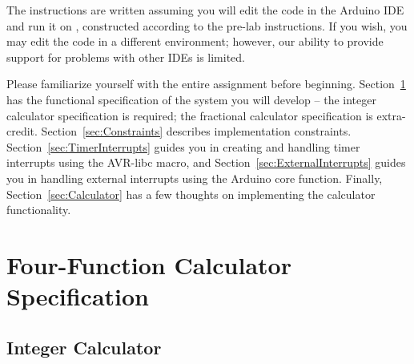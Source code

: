 The instructions are written assuming you will edit the code in the Arduino IDE
and run it on \runtimeenvironment, constructed according to the pre-lab
instructions. If you wish, you may edit the code in a different environment;
however, our ability to provide support for problems with other IDEs is limited.

Please familiarize yourself with the entire assignment before beginning.
Section~\ref{sec:FunctionalSpecification} has the functional specification of
the system you will develop -- the integer calculator specification is
required; the fractional calculator specification is extra-credit.
Section~\ref{sec:Constraints} describes implementation constraints.
Section~\ref{sec:TimerInterrupts} guides you in creating and handling timer
interrupts using the AVR-libc  macro, and
Section~\ref{sec:ExternalInterrupts} guides you in handling external interrupts
using the Arduino core  function. Finally,
Section~\ref{sec:Calculator} has a few thoughts on implementing the calculator
functionality.

\section{Four-Function Calculator Specification} \label{sec:FunctionalSpecification}

\subsection*{Integer Calculator}

